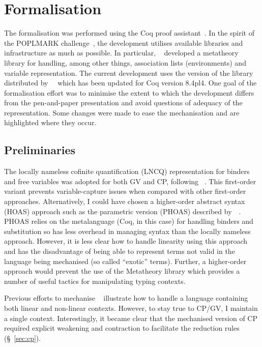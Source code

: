 \section{Formalisation}

The formalisation was performed using the Coq proof
assistant~\cite{Coq:manual}. In the spirit of the POPLMARK
challenge~\cite{Aydemir:2005:MMM}, the development utilises available
libraries and infrastructure as much as possible. In particular,
\citeauthor{Aydemir:2008:EFM}~\cite{Aydemir:2008:EFM} developed a metatheory
library for handling, among other things, association lists (environments) and
variable representation. The current development uses the version of the
library distributed by~\citeauthor{Park:2014:MMW}~\cite{Park:2014:MMW} which
has been updated for Coq version 8.4pl4. One goal of the formalisation effort
was to minimise the extent to which the development differs from the
pen-and-paper presentation and avoid questions of adequacy of the
representation. Some changes were made to ease the mechanisation and are
highlighted where they occur.

\subsection{Preliminaries}\label{sec:approach}

The locally nameless cofinite quantification (LNCQ) representation for binders
and free variables was adopted for both GV and CP, following
\citeauthor{Aydemir:2008:EFM}~\cite{Aydemir:2008:EFM}. This first-order
variant prevents variable-capture issues when compared with other first-order
approaches. Alternatively, I could have chosen a higher-order abstract syntax
(HOAS) approach such as the parametric version (PHOAS) described
by~\citeauthor{Chlipala:2008:PHOAS}~\cite{Chlipala:2008:PHOAS}. PHOAS relies
on the metalanguage (Coq, in this case) for handling binders and substitution
so has less overhead in managing syntax than the locally nameless
approach. However, it is less clear how to handle linearity using this
approach and has the disadvantage of being able to represent terms not valid
in the language being mechanised (so called ``exotic'' terms). Further, a
higher-order approach would prevent the use of the Metatheory library which
provides a number of useful tactics for manipulating typing contexts.

Previous efforts to mechanise \fpop~\cite{Park:2014:MMW} illustrate how to
handle a language containing both linear and non-linear contexts. However, to
stay true to CP/GV, I maintain a single context. Interestingly, it became
clear that the mechanised version of CP required explicit weakening and
contraction to facilitate the reduction rules (\S~\ref{sec:cp}).

